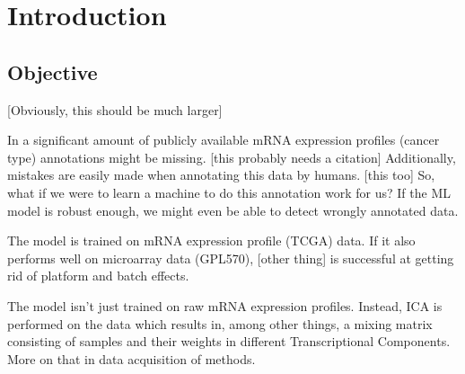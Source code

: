 \chapter{Introduction}

\section{Objective}
[Obviously, this should be much larger]

In a significant amount of publicly available mRNA expression profiles (cancer type) annotations might be missing. [this probably needs a citation]
Additionally, mistakes are easily made when annotating this data by humans. [this too]
So, what if we were to learn a machine to do this annotation work for us?
If the ML model is robust enough, we might even be able to detect wrongly annotated data.

The model is trained on mRNA expression profile (TCGA) data.
If it also performs well on microarray data (GPL570), [other thing] is successful at getting rid of platform and batch effects.

The model isn't just trained on raw mRNA expression profiles.
Instead, ICA is performed on the data which results in, among other things, a mixing matrix consisting of samples and their weights in different Transcriptional Components.
More on that in data acquisition of methods.
